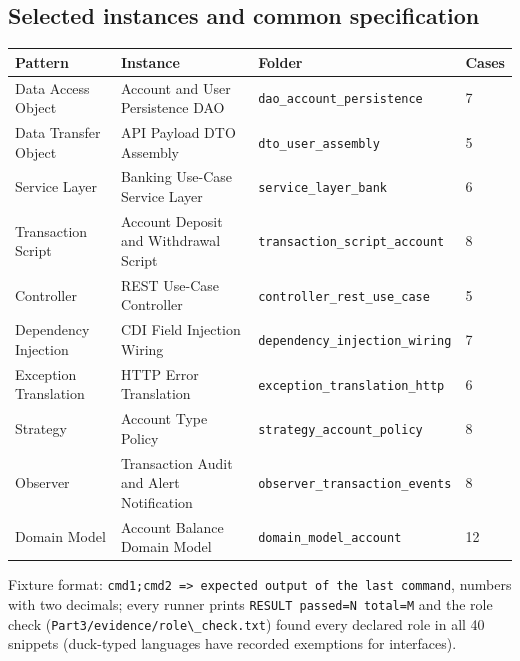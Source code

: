 \documentclass[11pt,a4paper]{article}
\begin{document}
\subsection{Selected instances and common specification}
{\footnotesize
\begin{center}\begin{tabular}{@{}p{3.2cm}p{5.4cm}p{5.6cm}p{1.2cm}@{}}
\toprule \textbf{Pattern} & \textbf{Instance} & \textbf{Folder} & \textbf{Cases} \\ \midrule
Data Access Object & Account and User Persistence DAO & \texttt{dao\_\allowbreak{}account\_\allowbreak{}persistence} & 7 \\
Data Transfer Object & API Payload DTO Assembly & \texttt{dto\_\allowbreak{}user\_\allowbreak{}assembly} & 5 \\
Service Layer & Banking Use-Case Service Layer & \texttt{service\_\allowbreak{}layer\_\allowbreak{}bank} & 6 \\
Transaction Script & Account Deposit and Withdrawal Script & \texttt{transaction\_\allowbreak{}script\_\allowbreak{}account} & 8 \\
Controller & REST Use-Case Controller & \texttt{controller\_\allowbreak{}rest\_\allowbreak{}use\_\allowbreak{}case} & 5 \\
Dependency Injection & CDI Field Injection Wiring & \texttt{dependency\_\allowbreak{}injection\_\allowbreak{}wiring} & 7 \\
Exception Translation & HTTP Error Translation & \texttt{exception\_\allowbreak{}translation\_\allowbreak{}http} & 6 \\
Strategy & Account Type Policy & \texttt{strategy\_\allowbreak{}account\_\allowbreak{}policy} & 8 \\
Observer & Transaction Audit and Alert Notification & \texttt{observer\_\allowbreak{}transaction\_\allowbreak{}events} & 8 \\
Domain Model & Account Balance Domain Model & \texttt{domain\_\allowbreak{}model\_\allowbreak{}account} & 12 \\
\bottomrule\end{tabular}\end{center}
}
Fixture format: \texttt{cmd1;cmd2 =\textgreater{} expected output of the last command}, numbers with two decimals; every runner prints \texttt{RESULT passed=N total=M} and the role check (\texttt{Part3/\allowbreak{}evidence/\allowbreak{}role\textbackslash{}\_\allowbreak{}check.\allowbreak{}txt}) found every declared role in all 40 snippets (duck-typed languages have recorded exemptions for interfaces).
\end{document}
